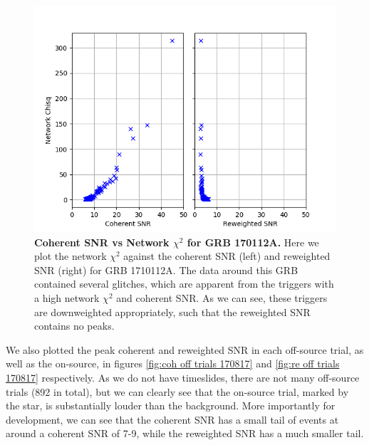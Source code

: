 \documentclass[11pt]{cuthesis}
\begin{document}
\begin{figure} %
\begin{center}
\includegraphics[width=0.8\linewidth]{network_snrs_vs_chisqN_GRB170112A.png}
\end{center}
\caption{\textbf{Coherent SNR vs Network $\chi^2$ for GRB 170112A.} Here we plot the network $\chi^2$ against the coherent SNR (left) and reweighted SNR (right) for GRB 1710112A. The data around this GRB contained several glitches, which are apparent from the triggers with a high network $\chi^2$ and coherent SNR. As we can see, these triggers are downweighted appropriately, such that the reweighted SNR contains no peaks.  } 
\label{fig:coh vs chisq GRB170112A}
\end{figure}



We also plotted the peak coherent and reweighted SNR in each off-source trial, as well as the on-source, in figures \ref{fig:coh off trials 170817} and \ref{fig:re off trials 170817} respectively. As we do not have timeslides, there are not many off-source trials (892 in total), but we can clearly see that the on-source trial, marked by the star, is substantially louder than the background. More importantly for development, we can see that the coherent SNR has a small tail of events at around a coherent SNR of 7-9, while the reweighted SNR has a much smaller tail. 
\end{document}
